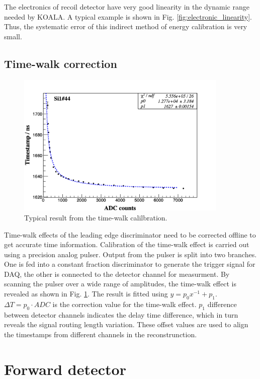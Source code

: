 \documentclass[number]{elsarticle}
\begin{document}
The electronics of recoil detector have very good linearity in the dynamic range needed by KOALA.
A typical example is shown in Fig. \ref{fig:electronic_linearity}. 
Thus, the systematic error of this indirect method of energy calibration is very small.

\subsection{Time-walk correction}
\label{sec:timewalk}

\begin{figure}[htbp]
\centering
\includegraphics[width=0.9\textwidth]{./timewalk.png}
\caption{Typical result from the time-walk calilbration.}
\label{fig:timewalk}
\end{figure}

Time-walk effects of the leading edge discriminator need to be corrected offline to get accurate time information.
Calibration of the time-walk effect is carried out using a  precision analog pulser. 
Output from the pulser is split into two branches. One is fed into a constant fraction discriminator to generate the trigger signal for DAQ, 
the other is connected to the detector channel for measurment. 
By scanning the pulser over a wide range of amplitudes, the time-walk effect is revealed as shown in Fig. \ref{fig:timewalk}.
The result is fitted using \(y=p_0 x^{-1} + p_1\). 
\(\Delta T = p_0 \cdot ADC\) is the correction value for the time-walk effect.
\(p_1\) difference between detector channels indicates the delay time difference, which in turn reveals the signal routing length variation.
These offset values are used to align the timestamps from different channels in the reconstrunction.

\section{Forward detector}
\label{sec:fwd}
\end{document}
